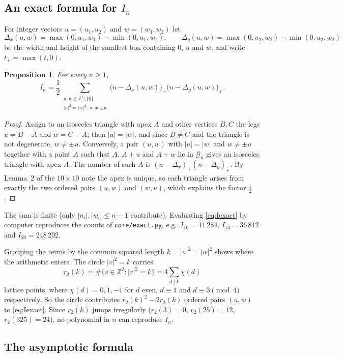 \documentclass[11pt,a4paper]{article}
\newtheorem{proposition}{Proposition}
\theoremstyle{remark}
\newcommand{\G}{\mathcal{G}}
\begin{document}
\subsection{An exact formula for $I_n$}

For integer vectors $u=(u_1,u_2)$ and $w=(w_1,w_2)$ let
\[
  \Delta_x(u,w)=\max(0,u_1,w_1)-\min(0,u_1,w_1),\qquad
  \Delta_y(u,w)=\max(0,u_2,w_2)-\min(0,u_2,w_2)
\]
be the width and height of the smallest box containing $0$, $u$ and $w$, and write
$t_+=\max(t,0)$.

\begin{proposition}\label{prop:exact}
For every $n\ge1$,
\begin{equation}\label{eq:Iexact}
  I_n=\frac12\sum_{\substack{u,w\in\mathbb{Z}^2\setminus\{0\}\\
      |u|^2=|w|^2,\ w\ne\pm u}}
  \bigl(n-\Delta_x(u,w)\bigr)_+\bigl(n-\Delta_y(u,w)\bigr)_+ .
\end{equation}
\end{proposition}
\begin{proof}
Assign to an isosceles triangle with apex $A$ and other vertices $B,C$ the legs
$u=B-A$ and $w=C-A$; then $|u|=|w|$, and since $B\ne C$ and the triangle is not
degenerate, $w\ne\pm u$. Conversely, a pair $(u,w)$ with $|u|=|w|$ and $w\ne\pm u$
together with a point $A$ such that $A$, $A+u$ and $A+w$ lie in $\G_n$ gives an
isosceles triangle with apex $A$. The number of such $A$ is
$(n-\Delta_x)_+(n-\Delta_y)_+$. By Lemma~2 of the $10\times10$ note the apex is
unique, so each triangle arises from exactly the two ordered pairs $(u,w)$ and
$(w,u)$, which explains the factor $\tfrac12$.
\end{proof}

The sum is finite (only $|u_i|,|w_i|\le n-1$ contribute). Evaluating
\eqref{eq:Iexact} by computer reproduces the counts of \texttt{core/exact.py},
e.g.\ $I_{10}=11\,284$, $I_{13}=36\,812$ and $I_{20}=248\,292$.

Grouping the terms by the common squared length $k=|u|^2=|w|^2$ shows where the
arithmetic enters. The circle $|v|^2=k$ carries
\[
  r_2(k)=\#\{v\in\mathbb{Z}^2 : |v|^2=k\}=4\sum_{d\mid k}\chi(d)
\]
lattice points, where $\chi(d)=0,1,-1$ for $d$ even, $d\equiv1$ and $d\equiv3
\pmod4$ respectively. So the circle contributes $r_2(k)^2-2r_2(k)$ ordered pairs
$(u,w)$ to \eqref{eq:Iexact}. Since $r_2(k)$ jumps irregularly ($r_2(3)=0$,
$r_2(25)=12$, $r_2(325)=24$), no polynomial in $n$ can reproduce $I_n$.

\subsection{The asymptotic formula}
\end{document}
